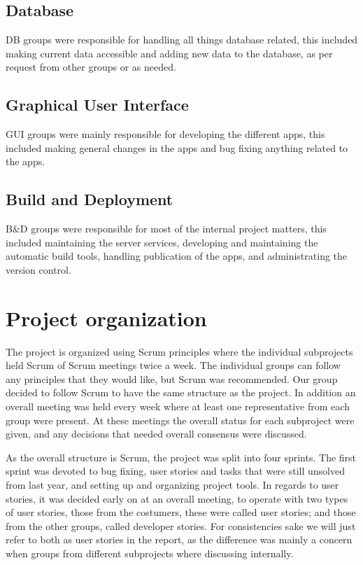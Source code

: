 \subsection{Database}
DB groups were responsible for handling all things database related, this included making current data accessible and adding new data to the database, as per request from other groups or as needed.

\subsection{Graphical User Interface}
GUI groups were mainly responsible for developing the different apps, this included making general changes in the apps and bug fixing anything related to the apps.

\subsection{Build and Deployment}
B\&D groups were responsible for most of the internal project matters, this included maintaining the server services, developing and maintaining the automatic build tools, handling publication of the apps, and administrating the version control.

\section{Project organization}
The project is organized using Scrum principles where the individual subprojects held Scrum of Scrum meetings twice a week. The individual groups can follow any principles that they would like, but Scrum was recommended. Our group decided to follow Scrum to have the same structure as the project.
In addition an overall meeting was held every week where at least one representative from each group were present. At these meetings the overall status for each subproject were given, and any decisions that needed overall consensus were discussed.

As the overall structure is Scrum, the project was split into four sprints. The first sprint was devoted to bug fixing, user stories and tasks that were still unsolved from last year, and setting up and organizing project tools. In regards to user stories, it was decided early on at an overall meeting, to operate with two types of user stories, those from the costumers, these were called user stories; and those from the other groups, called developer stories. For consistencies sake we will just refer to both as user stories in the report, as the difference was mainly a concern when groups from different subprojects where discussing internally.

